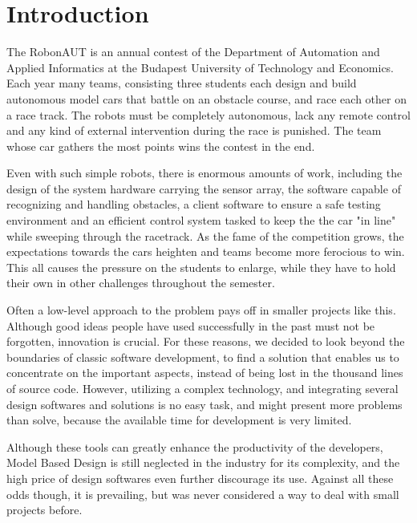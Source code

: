 \section{Introduction}
\label{sec:Introduction}


The RobonAUT is an annual contest of the Department of Automation and Applied Informatics at the Budapest University of Technology and Economics. Each year many teams, consisting three students each design and build autonomous model cars that battle on an obstacle course, and race each other on a race track. The robots must be completely autonomous, lack any remote control and any kind of external intervention during the race is punished. The team whose car gathers the most points wins the contest in the end\cite{rules}.


Even with such simple robots, there is enormous amounts of work, including the design of the system hardware carrying the sensor array, the software capable of recognizing and handling obstacles, a client software to ensure a safe testing environment and an efficient control system tasked to keep the the car "in line" while sweeping through the racetrack. As the fame of the competition grows, the expectations towards the cars heighten and teams become more ferocious to win. This all causes the pressure on the students to enlarge, while they have to hold their own in other challenges throughout the semester.


Often a low-level approach to the problem pays off in smaller projects like this. Although good ideas people have used successfully in the past must not be forgotten, innovation is crucial. For these reasons, we decided to look beyond the boundaries of classic software development, to find a solution that enables us to concentrate on the important aspects, instead of being lost in the thousand lines of source code. However, utilizing a complex technology, and integrating several design softwares and solutions is no easy task, and might present more problems than solve, because the available time for development is very limited.


Although these tools can greatly enhance the productivity of the developers, Model Based Design is still neglected in the industry for its complexity, and the high price of design softwares even further discourage its use. Against all these odds though, it is prevailing, but was never considered a way to deal with small projects before.

